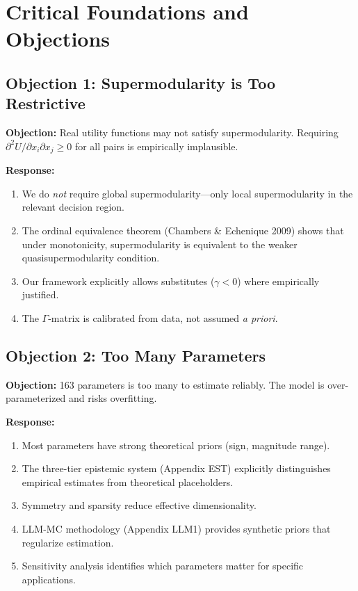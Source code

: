 
\section{Critical Foundations and Objections}
\label{sec:B-foundations-objections}

\subsection{Objection 1: Supermodularity is Too Restrictive}

\textbf{Objection:} Real utility functions may not satisfy supermodularity. 
Requiring $\partial^2 U / \partial x_i \partial x_j \geq 0$ for all pairs 
is empirically implausible.

\textbf{Response:} 
\begin{enumerate}[nosep]
    \item We do \textit{not} require global supermodularity---only local 
    supermodularity in the relevant decision region.
    \item The ordinal equivalence theorem (Chambers \& Echenique 2009) shows 
    that under monotonicity, supermodularity is equivalent to the weaker 
    quasisupermodularity condition.
    \item Our framework explicitly allows substitutes ($\gamma < 0$) where 
    empirically justified.
    \item The $\Gamma$-matrix is calibrated from data, not assumed 
    \textit{a priori}.
\end{enumerate}

\subsection{Objection 2: Too Many Parameters}

\textbf{Objection:} 163 parameters is too many to estimate reliably. The model 
is over-parameterized and risks overfitting.

\textbf{Response:}
\begin{enumerate}[nosep]
    \item Most parameters have strong theoretical priors (sign, magnitude range).
    \item The three-tier epistemic system (Appendix EST) explicitly distinguishes 
    empirical estimates from theoretical placeholders.
    \item Symmetry and sparsity reduce effective dimensionality.
    \item LLM-MC methodology (Appendix LLM1) provides synthetic priors that 
    regularize estimation.
    \item Sensitivity analysis identifies which parameters matter for 
    specific applications.
\end{enumerate}

